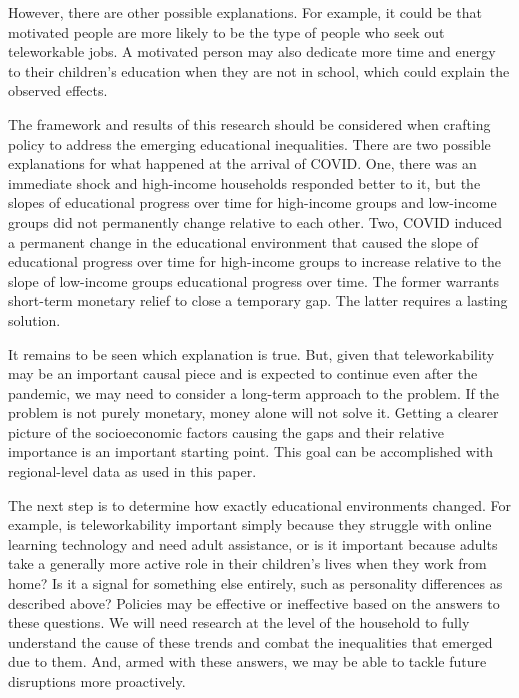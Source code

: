 However, there are other possible explanations. For example, it could be that motivated people are more likely to be the type of people who seek out teleworkable jobs. A motivated person may also dedicate more time and energy to their children’s education when they are not in school, which could explain the observed effects. \par
\fi
The framework and results of this research should be considered when crafting policy to address the emerging educational inequalities. There are two possible explanations for what happened at the arrival of COVID. One, there was an immediate shock and high-income households responded better to it, but the slopes of educational progress over time for high-income groups and low-income groups did not permanently change relative to each other. Two, COVID induced a permanent change in the educational environment that caused the slope of educational progress over time for high-income groups to increase relative to the slope of low-income groups educational progress over time. The former warrants short-term monetary relief to close a temporary gap. The latter requires a lasting solution. \par
It remains to be seen which explanation is true. But, given that teleworkability may be an important causal piece and is expected to continue even after the pandemic, we may need to consider a long-term approach to the problem. If the problem is not purely monetary, money alone will not solve it.  Getting a clearer picture of the socioeconomic factors causing the gaps and their relative importance is an important starting point. This goal can be accomplished with regional-level data as used in this paper.

The next step is to determine how exactly educational environments changed. For example, is teleworkability important simply because they struggle with online learning technology and need adult assistance, or is it important because adults take a generally more active role in their children’s lives when they work from home? Is it a signal for something else entirely, such as personality differences as described above? Policies may be effective or ineffective based on the answers to these questions. We will need research at the level of the household to fully understand the cause of these trends and combat the inequalities that emerged due to them. And, armed with these answers, we may be able to tackle future disruptions more proactively.


